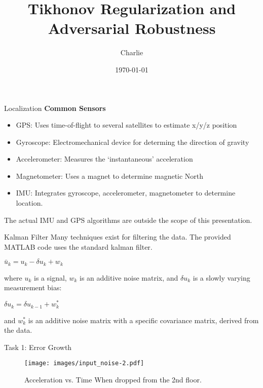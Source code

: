 \documentclass[10pt]{beamer}
\title{Tikhonov Regularization and Adversarial Robustness}
\author{Charlie}
\date{\today}
\theoremstyle{definition}
\let\olditem\item
\renewcommand{\item}{\setlength{\itemsep}{\fill}\olditem}
\begin{document}
\frame{\titlepage}

\begin{frame}{Localization}
\textbf{Common Sensors}
\begin{itemize}
    \item GPS: Uses time-of-flight to several satellites to estimate x/y/z position
    \item Gyroscope: Electromechanical device for determing the direction of gravity
    \item Accelerometer: Measures the `instantaneous' acceleration
    \item Magnetometer: Uses a magnet to determine magnetic North
    \item IMU: Integrates gyroscope, accelerometer, magnetometer to determine location. 
\end{itemize}
The actual IMU and GPS algorithms are outside the scope of this presentation.
\end{frame}

\begin{frame}{Kalman Filter}
    Many techniques exist for filtering the data. The provided MATLAB code uses the standard kalman filter.
    
    $\bar{u}_k = u_k - \delta u_k + w_k$
    
    where $u_k$ is a signal, $w_k$ is an additive noise matrix, and $\delta u_k$ is a slowly varying measurement bias:
    
    $ \delta u_k = \delta u_{k-1} + w_k^*$

    and $w_k^*$ is an additive noise matrix with a specific covariance matrix, derived from the data.
\end{frame}


\begin{frame}{Task 1: Error Growth}
\begin{figure}
    \texttt{[image: images/input\_noise-2.pdf]}
    \caption{Acceleration vs. Time When dropped from the 2nd floor.}
    \label{fig:my_label}
\end{figure}
\end{frame}



% 
% 
\end{document}
